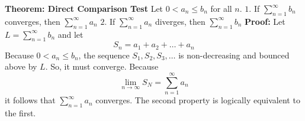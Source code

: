 \nopagenumbers
{\bf Theorem: Direct Comparison Test}
\vskip 6pt
Let $0<a_n \leq b_n$ for all $n$.
\vskip 6mm
$1.$ If $\sum_{n=1}^\infty b_n$ converges, then $\sum_{n=1}^\infty a_n$
\vskip 6mm
$2.$ If $\sum_{n=1}^\infty a_n$ diverges, then $\sum_{n=1}^\infty b_n$
\vskip 10pt
{\bf Proof:}
\vskip 6pt
Let $L=\sum_{n=1}^\infty b_n$ and let $$S_n=a_1+a_2+\ldots+a_n$$ Because $0<a_n \leq b_n$, the sequence $S_1,S_2,S_3,\ldots$ is non-decreasing and bounced above by $L$. So, it must converge. Because $$\lim_{n\to\infty}S_N=\sum_{n=1}^\infty a_n$$ it follows that $\sum_{n=1}^\infty a_n$ converges. The second property is logically equivalent to the first.

\vfill\eject
